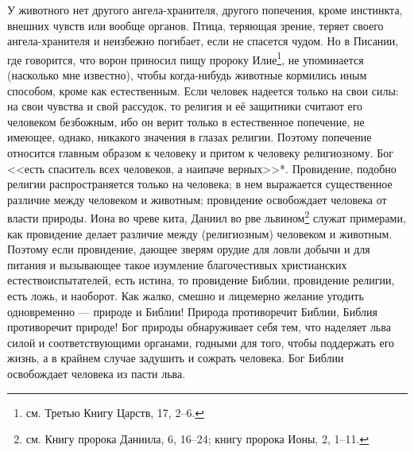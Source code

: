 \documentclass[12pt,oneside]{book}
\begin{document}
У животного нет другого ангела-хранителя, другого попечения, кроме инстинкта, внешних чувств или вообще органов. Птица, теряющая зрение, теряет своего ангела-хранителя и неизбежно погибает, если не спасется чудом. Но в Писании, где говорится, что ворон приносил пищу пророку Илие\footnote{см. Третью Книгу Царств, 17, 2--6.}, не упоминается (насколько мне известно), чтобы когда-нибудь животные кормились иным способом, кроме как естественным. Если человек надеется только на свои силы: на свои чувства и свой рассудок, то религия и её защитники считают его человеком безбожным, ибо он верит только в естественное попечение, не имеющее, однако, никакого значения в глазах религии. Поэтому попечение относится главным образом к человеку и притом к человеку религиозному. Бог <<есть спаситель всех человеков, а наипаче верных>>*\let\svthefootnote\thefootnote\let\thefootnote\relax{}\let\thefootnote\svthefootnote. Провидение, подобно религии распространяется только на человека; в нем выражается существенное различие между человеком и животным; провидение освобождает человека от власти природы. Иона во чреве кита, Даниил во рве львином\footnote{см. Книгу пророка Даниила, 6, 16--24; книгу пророка Ионы, 2, 1--11.} служат примерами, как провидение делает различие между (религиозным) человеком и животным. Поэтому если провидение, дающее зверям орудие для ловли добычи и для питания и вызывающее такое изумление благочестивых христианских естествоиспытателей, есть истина, то провидение Библии, провидение религии, есть ложь, и наоборот. Как жалко, смешно и лицемерно желание угодить одновременно --- природе и Библии! Природа противоречит Библии, Библия противоречит природе! Бог природы обнаруживает себя тем, что наделяет льва силой и соответствующими органами, годными для того, чтобы поддержать его жизнь, а в крайнем случае задушить и сожрать человека. Бог Библии освобождает человека из пасти льва\dag\let\svthefootnote\thefootnote\let\thefootnote\relax{}\let\thefootnote\svthefootnote.
\end{document}
